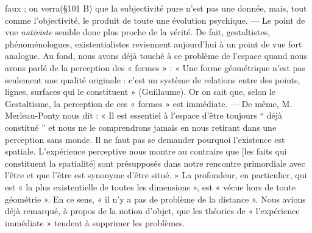 faux ; on verra(\S 101 B) que la subjectivité pure n’est pas une donnée,
mais, tout comme l’objectivité, le produit de toute une évolution
psychique. — Le point de vue {\it nativiste} semble donc plus proche de
la vérité. De fait, gestaltistes, phénoménologues, existentialistes
reviennent aujourd’hui à un point de vue fort analogue. Au fond, nous
avons déjà touché à ce problème de l’espace quand nous avons parlé
de la perception des « formes » : « Une forme géométrique n’est pas
seulement une qualité originale : c’est un système de relations entre
des points, lignes, surfaces qui le constituent » (Guillaume). Or on
sait que, selon le Gestaltisme, la perception de ces « formes » est
immédiate. — De même, M. Merleau-Ponty nous dit : « Il est
essentiel à l’espace d’être toujours “ déjà constitué ” et nous ne le
comprendrons jamais en nous retirant dans une perception sans monde.
Il ne faut pas se demander pourquoi l’existence est spatiale. L’expérience
perceptive nous montre au contraire que [les faits qui constituent
la spatialité] sont présupposés dans notre rencontre primordiale avec
l’être et que l'être est synonyme d’être situé. » La profondeur, en
particulier, qui est « la plus existentielle de toutes les dimensions »,
est « vécue hors de toute géométrie ». En ce sens, « il n’y a pas de problème
de la distance ». Nous avions déjà remarqué, à propos de la
notion d’objet, que les théories de « l’expérience immédiate » tendent
à supprimer les problèmes.

